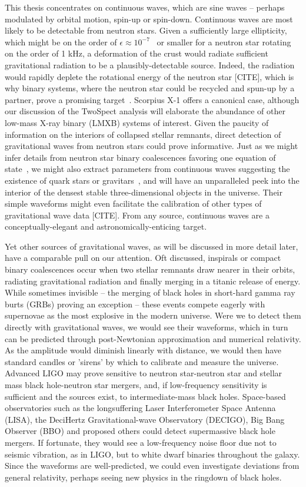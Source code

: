 This thesis concentrates on continuous waves, which are sine waves -- perhaps modulated by orbital motion, spin-up or spin-down. 
Continuous waves are most likely to be detectable from neutron stars. 
Given a sufficiently large ellipticity, which might be on the order of $\epsilon \approx 10^{-7}$~\cite{Owen2005} or smaller for a neutron star rotating on the order of 1 kHz, a deformation of the crust would radiate sufficient gravitational radiation to be a plausibly-detectable source. 
Indeed, the radiation would rapidly deplete the rotational energy of the neutron star [CITE], which is why binary systems, where the neutron star could be recycled and spun-up by a partner, prove a promising target~\cite{PapaloizouPringle1978,Wagoner1984}. 
Scorpius X-1 offers a canonical case, although our discussion of the TwoSpect analysis will elaborate the abundance of other low-mass X-ray binary (LMXB) systems of interest. 
Given the paucity of information on the interiors of collapsed stellar remnants, direct detection of gravitational waves from neutron stars could prove informative. 
Just as we might infer details from neutron star binary coalescences favoring one equation of state~\cite{Lattimer2007,Read2009}, we might also extract parameters from continuous waves suggesting the existence of quark stars or gravitars~\cite{Owen2005}, and will have an unparalleled peek into the interior of the densest stable three-dimensional objects in the universe. 
Their simple waveforms might even facilitate the calibration of other types of gravitational wave data [CITE]. 
From any source, continuous waves are a conceptually-elegant and astronomically-enticing target.

		Yet other sources of gravitational waves, as will be discussed in more detail later, have a comparable pull on our attention. Oft discussed, inspirals or compact binary coalescences occur when two stellar remnants draw nearer in their orbits, radiating gravitational radiation and finally merging in a titanic release of energy. While sometimes invisible -- the merging of black holes in short-hard gamma ray burts (GRBs) proving an exception -- these events compete eagerly with supernovae as the most explosive in the modern universe. Were we to detect them directly with gravitational waves, we would see their waveforms, which in turn can be predicted through post-Newtonian approximation and numerical relativity. As the amplitude would diminish linearly with distance, we would then have standard candles or 'sirens' by which to calibrate and measure the universe. Advanced LIGO may prove sensitive to neutron star-neutron star and stellar mass black hole-neutron star mergers, and, if low-frequency sensitivity is sufficient and the sources exist, to intermediate-mass black holes. Space-based observatories such as the longsuffering Laser Interferometer Space Antenna (LISA), the DeciHertz Gravitational-wave Observatory (DECIGO), Big Bang Observer (BBO) and proposed others could detect supermassive black hole mergers. If fortunate, they would see a low-frequency noise floor due not to seismic vibration, as in LIGO, but to white dwarf binaries throughout the galaxy. Since the waveforms are well-predicted, we could even investigate deviations from general relativity, perhaps seeing new physics in the ringdown of black holes.

